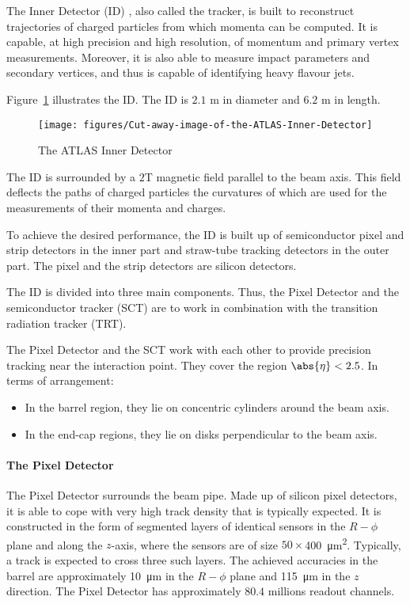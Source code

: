 The Inner Detector (ID) \cite{lhcaccexp}, also called the tracker, is built to
reconstruct trajectories of charged particles from which momenta can be
computed. It is capable, at high precision and high resolution, of momentum and
primary vertex measurements. Moreover, it is also able to measure impact
parameters and secondary vertices, and thus is capable of identifying heavy
flavour jets.

Figure~\ref{f:innerd} illustrates the ID. The ID is $2.1$ m in diameter and
$6.2$ m in length.



\begin{figure}[H]
	\texttt{[image: figures/Cut-away-image-of-the-ATLAS-Inner-Detector]}
	\centering
	\caption{The ATLAS Inner Detector}
	\label{f:innerd}
\end{figure}


The ID is surrounded by a $2$T magnetic field parallel to the beam axis. This
field deflects the paths of charged particles the curvatures of which are used
for the measurements of their momenta and charges.

To achieve the desired performance, the ID is built up of semiconductor pixel
and strip detectors in the inner part and straw-tube tracking detectors in the
outer part. The pixel and the strip detectors are silicon detectors.

The ID is divided into three main components. Thus, the Pixel Detector and the
semiconductor tracker (SCT) are to work in combination with the transition
radiation tracker (TRT).

\vspace{5mm}

The Pixel Detector and the SCT work with each other to provide precision
tracking near the interaction point. They cover the region $\abs{\eta}<2.5$. In
terms of arrangement:

\begin{itemize}
	\item In the barrel region, they lie on concentric cylinders around the beam axis.
	\item In the end-cap regions, they lie on disks perpendicular to the beam axis.
\end{itemize}

\paragraph{The Pixel Detector} The Pixel Detector surrounds the beam pipe. Made
up of silicon pixel detectors, it is able to cope with very high track density
that is typically expected. It is constructed in the form of segmented layers of
identical sensors in the $R-\phi$ plane and along the $z$-axis, where the
sensors are of size $50\times$\SI{400}{\micro\meter^2}. Typically, a track is
expected to cross three such layers. The achieved accuracies in the barrel are
approximately \SI{10}{\micro\meter} in the $R-\phi$ plane and
\SI{115}{\micro\meter} in the $z$ direction. The Pixel Detector has
approximately $80.4$ millions readout channels.



